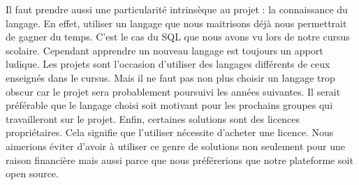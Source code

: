     Il faut prendre aussi une particularité intrinsèque au projet : la connaissance du langage.
    En effet, utiliser un langage que nous maitrisons déjà nous permettrait de gagner du temps.
    C’est le cas du SQL que nous avons vu lors de notre cursus scolaire. Cependant apprendre un
    nouveau langage est toujours un apport ludique. Les projets sont l’occasion d’utiliser des
    langages différents de ceux enseignés dans le cursus. Mais il ne faut pas non plus choisir
    un langage trop obscur car le projet sera probablement poursuivi les années suivantes.
    Il serait préférable que le langage choisi soit motivant pour les prochains groupes qui travailleront sur le projet.
    Enfin, certaines solutions sont des licences propriétaires. Cela signifie que l’utiliser
    nécessite d’acheter une licence. Nous aimerions éviter d’avoir à utiliser ce genre de solutions
    non seulement pour une raison financière mais aussi parce que nous préférerions  que notre plateforme soit open source.


